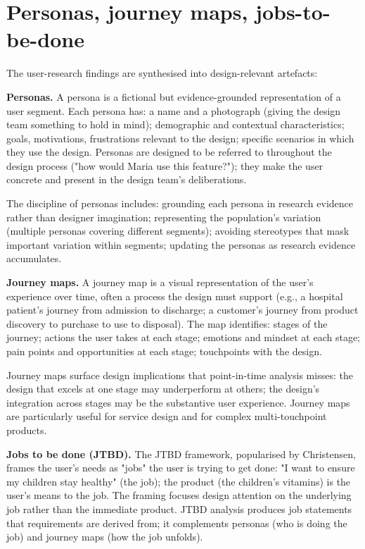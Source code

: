 \section{Personas, journey maps, jobs-to-be-done}

The user-research findings are synthesised into design-relevant artefacts:

\textbf{Personas.} A persona is a fictional but evidence-grounded representation of a user segment. Each persona has: a name and a photograph (giving the design team something to hold in mind); demographic and contextual characteristics; goals, motivations, frustrations relevant to the design; specific scenarios in which they use the design. Personas are designed to be referred to throughout the design process ("how would Maria use this feature?"); they make the user concrete and present in the design team's deliberations.

The discipline of personas includes: grounding each persona in research evidence rather than designer imagination; representing the population's variation (multiple personas covering different segments); avoiding stereotypes that mask important variation within segments; updating the personas as research evidence accumulates.

\textbf{Journey maps.} A journey map is a visual representation of the user's experience over time, often a process the design must support (e.g., a hospital patient's journey from admission to discharge; a customer's journey from product discovery to purchase to use to disposal). The map identifies: stages of the journey; actions the user takes at each stage; emotions and mindset at each stage; pain points and opportunities at each stage; touchpoints with the design.

Journey maps surface design implications that point-in-time analysis misses: the design that excels at one stage may underperform at others; the design's integration across stages may be the substantive user experience. Journey maps are particularly useful for service design and for complex multi-touchpoint products.

\textbf{Jobs to be done (JTBD).} The JTBD framework, popularised by Christensen, frames the user's needs as "jobs" the user is trying to get done: "I want to ensure my children stay healthy" (the job); the product (the children's vitamins) is the user's means to the job. The framing focuses design attention on the underlying job rather than the immediate product. JTBD analysis produces job statements that requirements are derived from; it complements personas (who is doing the job) and journey maps (how the job unfolds).

